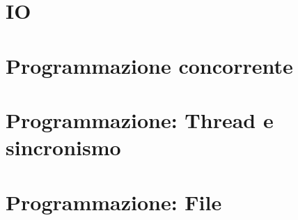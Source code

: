 \documentclass{article}
\begin{document}
    \section {IO}
        
    
    \newpage
    \section {Programmazione concorrente}
        
    \section {Programmazione: Thread e sincronismo}
        
    \section {Programmazione: File}
        
    
\end{document}
